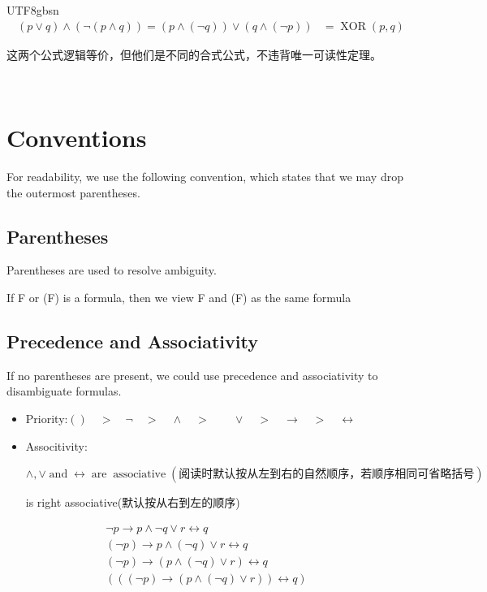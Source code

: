 \documentclass{article}
\begin{document}
\begin{CJK*}{UTF8}{gbsn}
\begin{align}
  (p \vee q) \wedge (\neg (p \wedge q)) = (p \wedge (\neg q)) \vee (q \wedge
  (\neg p)) & =\ensuremath{\operatorname{XOR}} (p, q) \nonumber
\end{align}

这两个公式逻辑等价，但他们是不同的合式公式，不违背唯一可读性定理。

\

\section{Conventions}

For readability, we use the following convention, which states that we may
drop the outermost parentheses.

\subsection{Parentheses}

Parentheses are used to resolve ambiguity.

If F or (F) is a formula, then we view F and (F) as the same formula

\subsection{Precedence and Associativity}

If no parentheses are present, we could use precedence and associativity to
disambiguate formulas.
\begin{itemize}
  \renewcommand{\labelitemi}{$\bullet$}\renewcommand{\labelitemii}{$\bullet$}\renewcommand{\labelitemiii}{$\bullet$}\renewcommand{\labelitemiv}{$\bullet$}\item
  Priority:$() \hspace{1em} > \quad \neg \quad > \quad \wedge \quad > \quad
  \hspace{1em} \vee \quad > \quad \rightarrow \quad > \quad \leftrightarrow$
  
  \item Associtivity:
  
  $\wedge, \vee \ensuremath{\operatorname{and}} \leftrightarrow
  \ensuremath{\operatorname{are}}\ensuremath{\operatorname{associative}}
  (阅读时默认按从左到右的自然顺序，若顺序相同可省略括号)$
  
  {\rightarrow} is right associative($默认按从右到左的顺序$)
\end{itemize}
\begin{align}
  \neg p \rightarrow p \wedge \neg q \vee r \leftrightarrow q &  \nonumber\\
  (\neg p) \rightarrow p \wedge (\neg q) \vee r \leftrightarrow q & 
  \nonumber\\
  (\neg p) \rightarrow (p \wedge (\neg q) \vee r) \leftrightarrow q & 
  \nonumber\\
  (((\neg p) \rightarrow (p \wedge (\neg q) \vee r)) \leftrightarrow q) & 
  \nonumber
\end{align}

\

\

\

\

\end{CJK*}
\end{document}
